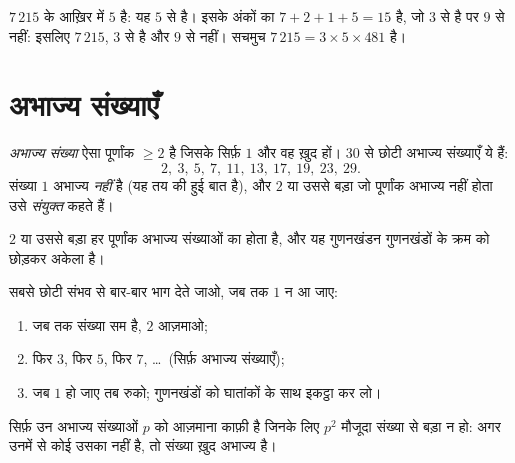 \begin{example}
$7\,215$ के आख़िर में $5$ है: यह $5$ से  है। इसके अंकों का
 $7 + 2 + 1 + 5 = 15$ है, जो $3$ से  है पर $9$ से नहीं:
इसलिए $7\,215$, $3$ से  है और $9$ से नहीं। सचमुच
$7\,215 = 3 \times 5 \times 481$ है।
\end{example}

\section{अभाज्य संख्याएँ}

\begin{definition}[अभाज्य संख्या]\label{def:g9:arith:prime}
\emph{अभाज्य संख्या} ऐसा पूर्णांक $\geq 2$ है
जिसके  सिर्फ़ $1$ और वह ख़ुद हों। $30$ से छोटी अभाज्य संख्याएँ ये
हैं:
\[
2,\ 3,\ 5,\ 7,\ 11,\ 13,\ 17,\ 19,\ 23,\ 29 .
\]
संख्या $1$ अभाज्य \emph{नहीं} है (यह तय की हुई बात है), और $2$ या
उससे बड़ा जो पूर्णांक अभाज्य नहीं होता उसे \emph{संयुक्त} कहते हैं।
\end{definition}

\begin{theorem}[अभाज्य गुणनखंडन]\label{thm:g9:arith:factorization}
$2$ या उससे बड़ा हर पूर्णांक अभाज्य संख्याओं का  होता है, और यह
गुणनखंडन गुणनखंडों के क्रम को छोड़कर अकेला है।
\end{theorem}
\admitted

\begin{method}[किसी पूर्णांक का गुणनखंडन]\label{met:g9:arith:factorization}
सबसे छोटी संभव  से बार-बार भाग देते जाओ, जब तक $1$ न आ
जाए:
\begin{enumerate}
  \item जब तक संख्या सम है, $2$ आज़माओ;
  \item फिर $3$, फिर $5$, फिर $7$, \dots\ (सिर्फ़ अभाज्य संख्याएँ);
  \item जब  $1$ हो जाए तब रुको; गुणनखंडों को घातांकों के साथ
        इकट्ठा कर लो।
\end{enumerate}
सिर्फ़ उन अभाज्य संख्याओं $p$ को आज़माना काफ़ी है जिनके लिए $p^2$ मौजूदा
संख्या से बड़ा न हो: अगर उनमें से कोई उसका  नहीं है, तो संख्या
ख़ुद अभाज्य है।
\end{method}

